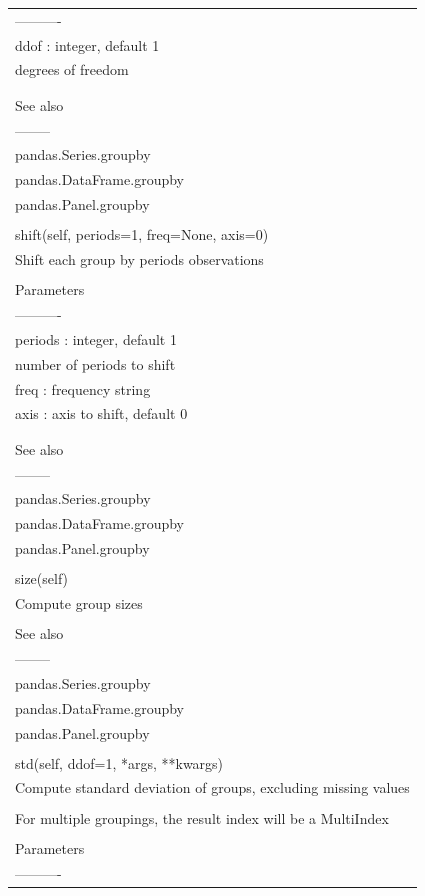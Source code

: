 \documentclass[11pt]{article}
\begin{document}
\begin{enumerate}
\begin{enumerate}
\begin{enumerate}
\begin{center}
\begin{tabular}{l}
----------\\
ddof : integer, default 1\\
degrees of freedom\\
\\
\\
See also\\
--------\\
pandas.Series.groupby\\
pandas.DataFrame.groupby\\
pandas.Panel.groupby\\
\\
shift(self, periods=1, freq=None, axis=0)\\
Shift each group by periods observations\\
\\
Parameters\\
----------\\
periods : integer, default 1\\
number of periods to shift\\
freq : frequency string\\
axis : axis to shift, default 0\\
\\
\\
See also\\
--------\\
pandas.Series.groupby\\
pandas.DataFrame.groupby\\
pandas.Panel.groupby\\
\\
size(self)\\
Compute group sizes\\
\\
See also\\
--------\\
pandas.Series.groupby\\
pandas.DataFrame.groupby\\
pandas.Panel.groupby\\
\\
std(self, ddof=1, *args, **kwargs)\\
Compute standard deviation of groups, excluding missing values\\
\\
For multiple groupings, the result index will be a MultiIndex\\
\\
Parameters\\
----------\\

\end{tabular}
\end{center}
\end{enumerate}
\end{enumerate}
\end{enumerate}
\end{document}
